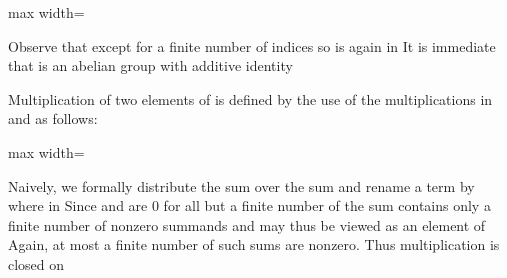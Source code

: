 \documentclass[11pt,oneside]{article}
\begin{document}
\begin{BookBody}
\begin{center}\begin{adjustbox}{max width=\linewidth}\end{adjustbox}\end{center}

\noindent Observe that  except for a finite number of indices  so  is again in  It is immediate that  is an abelian group with additive identity 

Multiplication of two elements of  is defined by the use of the multiplications in  and  as follows:

\begin{center}\begin{adjustbox}{max width=\linewidth}\end{adjustbox}\end{center}

\noindent Naively, we formally distribute the sum  over the sum  and rename a term  by  where  in  Since  and  are 0 for all but a finite 
number of  the sum  contains only a finite number of nonzero summands  and may thus be viewed as an element of  Again, at most a finite number of such sums  are nonzero. Thus multiplication is closed on 

\end{BookBody}

\BookNarrativetrue
\end{document}
